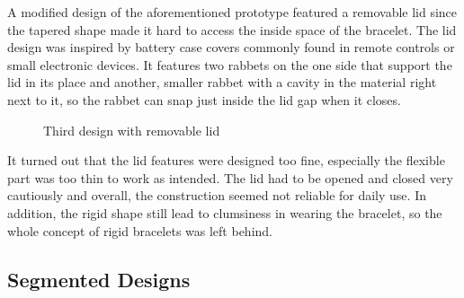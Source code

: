 A modified design of the aforementioned prototype featured a removable lid since the tapered shape made it hard to access the inside space of the bracelet. The lid design was inspired by battery case covers commonly found in remote controls or small electronic devices. It features two rabbets on the one side that support the lid in its place and another, smaller rabbet with a cavity in the material right next to it, so the rabbet can snap just inside the lid gap when it closes.

\begin{figure}[bth]
	\myfloatalign
	 \quad
	\caption{Third design with removable lid}
\end{figure}

It turned out that the lid features were designed too fine, especially the flexible part was too thin to work as intended. The lid had to be opened and closed very cautiously and overall, the construction seemed not reliable for daily use. In addition, the rigid shape still lead to clumsiness in wearing the bracelet, so the whole concept of rigid bracelets was left behind.

\subsection{Segmented Designs}

